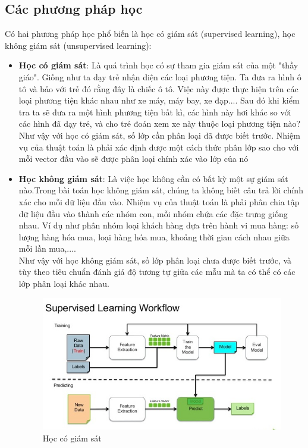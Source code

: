 \subsection{Các phương pháp học}
Có hai phương pháp học phổ biến là học có giám sát (supervised learning), học không giám sát (unsupervised learning):

\begin{itemize}
	\item \textbf{Học có giám sát}: Là quá trình học có sự tham gia giám sát của một "thầy giáo". Giống như ta dạy trẻ nhận diện các loại phương tiện. Ta đưa ra hình ô tô và bảo với trẻ đó rằng đây là chiếc ô tô. Việc này được thực hiện trên các loại phương tiện khác nhau như xe máy, máy bay, xe đạp.... Sau đó khi kiểm tra ta sẽ đưa ra một hình phương tiện bất kì, các hình này hơi khác so với các hình đã dạy trẻ, và cho trẻ đoán xem xe này thuộc loại phương tiện nào?\\
	Như vậy với học có giám sát, số lớp cần phân loại đã được biết trước. Nhiệm vụ của thuật toán là phải xác định được một cách thức phân lớp sao cho với mỗi vector đầu vào sẽ được phân loại chính xác vào lớp của nó
	
	\item \textbf{Học không giám sát}: Là việc học không cần có bất kỳ một sự giám sát nào.Trong bài toán học không giám sát, chúng ta không biết câu trả lời chính xác cho mỗi dữ liệu đầu vào. Nhiệm vụ của thuật toán là phải phân chia tập dữ liệu đầu vào thành các nhóm con, mỗi nhóm chứa các đặc trưng giống nhau. Ví dụ như phân nhóm loại khách hàng dựa trên hành vi mua hàng: số lượng hàng hóa mua, loại hàng hóa mua, khoảng thời gian cách nhau giữa mỗi lần mua,....\\
	 Như vậy với học không giám sát, số lớp phân loại chưa được biết trước, và tùy theo tiêu chuẩn đánh giá độ tương tự giữa các mẫu mà ta có thể có các lớp phân loại khác nhau.
\begin{center}
\begin{figure}[H]
\begin{center}
\includegraphics[scale=1.2]{chap3/image/supervise_workflow.jpeg}
\caption{Học có giám sát}
\label{fig:supervisedlearning}
\end{center}
\end{figure}
\end{center}

\end{itemize}

